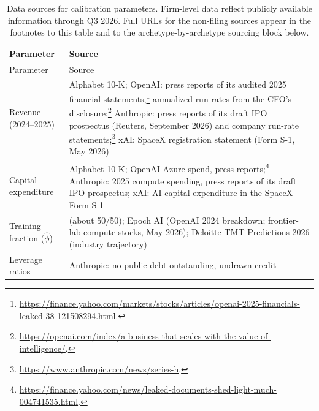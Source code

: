 \documentclass[
  11pt,
  letterpaper,
]{scrartcl}
\begin{document}
\begin{longtable}[]{@{}
  >{\raggedright\arraybackslash}p{}
  >{\raggedright\arraybackslash}p{}@{}}
\caption{Data sources for calibration parameters. Firm-level data
reflect publicly available information through Q3 2026. Full URLs for
the non-filing sources appear in the footnotes to this table and to the
archetype-by-archetype sourcing block
below.}\label{tbl-sources}\tabularnewline
\toprule\noalign{}
\begin{minipage}[b]{\linewidth}\raggedright
Parameter
\end{minipage} & \begin{minipage}[b]{\linewidth}\raggedright
Source
\end{minipage} \\
\midrule\noalign{}
\endfirsthead
\toprule\noalign{}
\begin{minipage}[b]{\linewidth}\raggedright
Parameter
\end{minipage} & \begin{minipage}[b]{\linewidth}\raggedright
Source
\end{minipage} \\
\midrule\noalign{}
\endhead
\bottomrule\noalign{}
\endlastfoot
Revenue (2024--2025) & Alphabet 10-K; OpenAI: press reports of its
audited 2025 financial statements,\footnote{\url{https://finance.yahoo.com/markets/stocks/articles/openai-2025-financials-leaked-38-121508294.html}.}
annualized run rates from the CFO's disclosure;\footnote{\url{https://openai.com/index/a-business-that-scales-with-the-value-of-intelligence/}.}
Anthropic: press reports of its draft IPO prospectus (Reuters, September
2026) and company run-rate statements;\footnote{\url{https://www.anthropic.com/news/series-h}.}
xAI: SpaceX registration statement (Form S-1, May 2026) \\
Capital expenditure & Alphabet 10-K; OpenAI Azure spend, press
reports;\footnote{\url{https://finance.yahoo.com/news/leaked-documents-shed-light-much-004741535.html}.}
Anthropic: 2025 compute spending, press reports of its draft IPO
prospectus; xAI: AI capital expenditure in the SpaceX Form S-1 \\
Training fraction (\(\hat{\phi}\)) & \citet{amodei2026dwarkesh} (about
50/50); Epoch AI (OpenAI 2024 breakdown; frontier-lab compute stocks,
May 2026); Deloitte TMT Predictions 2026 (industry trajectory) \\
Leverage ratios & Anthropic: no public debt outstanding, undrawn credit

\end{longtable}
\end{document}
